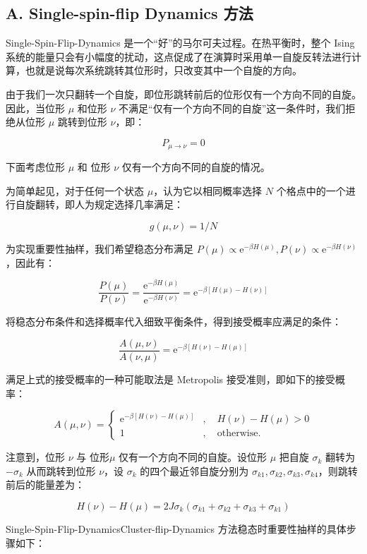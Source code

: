 \documentclass[aps,prl,twocolumn,groupedaddress]{revtex4-2}
\begin{document}
\subsection{A. Single-spin-flip Dynamics 方法}

Single-Spin-Flip-Dynamics 是一个“好”的马尔可夫过程。在热平衡时，整个 Ising 系统的能量只会有小幅度的扰动，这点促成了在演算时采用单一自旋反转法进行计算，也就是说每次系统跳转其位形时，只改变其中一个自旋的方向。

由于我们一次只翻转一个自旋，即位形跳转前后的位形仅有一个方向不同的自旋。因此，当位形 $\mu $ 和位形 $\nu $ 不满足“仅有一个方向不同的自旋”这一条件时，我们拒绝从位形 $\mu $ 跳转到位形 $\nu $，即：

$$
P_{\mu\to \nu}= 0
$$

下面考虑位形 $\mu $ 和 位形 $\nu $ 仅有一个方向不同的自旋的情况。

为简单起见，对于任何一个状态 $\mu $，认为它以相同概率选择 $N $ 个格点中的一个进行自旋翻转，即人为规定选择几率满足：

$$
g(\mu,\nu) = 1/N
$$

为实现重要性抽样，我们希望稳态分布满足 $P(\mu)\propto \mathrm{e}^{-\beta H(\mu)},P(\nu)\propto \mathrm{e}^{-\beta H(\nu)} $，因此有：

$$
\frac{P(\mu) }{P(\nu) } 
=\frac{\mathrm{e}^{-\beta H(\mu)} }{\mathrm{e}^{-\beta H(\nu)} } 
=\mathrm{e}^{-\beta \left[H(\mu)-H(\nu) \right]}
$$

将稳态分布条件和选择概率代入细致平衡条件，得到接受概率应满足的条件：

$$
\frac{A(\mu,\nu) }{A(\nu,\mu) } = \mathrm{e}^{-\beta \left[H(\nu)-H(\mu) \right]}
$$

满足上式的接受概率的一种可能取法是 Metropolis 接受准则，即如下的接受概率：

$$
A(\mu,\nu)
=\left\{
\begin{array}{ll}
\mathrm{e}^{-\beta\left[H(\nu)-H(\mu) \right]}&,\quad H(\nu)-H(\mu)>0 \\
1 &,\quad \mathrm{otherwise.}
\end{array}
\right.
$$

注意到，位形 $\nu $ 与 位形$\mu $ 仅有一个方向不同的自旋。设位形 $\mu$ 把自旋 $\sigma_k$ 翻转为 $-\sigma_k$ 从而跳转到位形 $\nu$，设 $\sigma_k $ 的四个最近邻自旋分别为 $\sigma_{k1},\sigma_{k2},\sigma_{k3},\sigma_{k4} $，则跳转前后的能量差为：

$$
H(\nu)-H(\mu)
=2J\sigma_k(\sigma_{k1}+\sigma_{k2}+\sigma_{k3}+\sigma_{k1})
$$

Single-Spin-Flip-DynamicsCluster-flip-Dynamics 方法稳态时重要性抽样的具体步骤如下：
\end{document}

